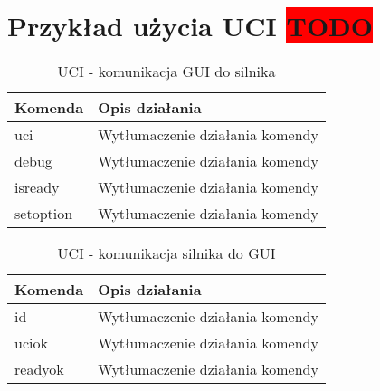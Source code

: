 \chapter{Przykład użycia UCI \colorbox{red}{TODO}}
\label{ch:przyklad-uci}

\begin{table}[htb] \small
\centering
\caption{UCI - komunikacja GUI do silnika}
\label{tab:UCI_GUI_silnik}
\begin{tabularx}{\linewidth}{|p{.25\linewidth}|X|}\hline
Komenda & Opis działania \\ \hline\hline

uci & Wytłumaczenie działania komendy \\ \hline
debug & Wytłumaczenie działania komendy \\ \hline
isready & Wytłumaczenie działania komendy \\ \hline
setoption & Wytłumaczenie działania komendy \\ \hline
\end{tabularx}
\end{table}

\begin{table}[htb] \small
\centering
\caption{UCI - komunikacja silnika do GUI}
\label{tab:UCI_silnik_GUI}
\begin{tabularx}{\linewidth}{|p{.25\linewidth}|X|}\hline
Komenda & Opis działania \\ \hline\hline

id & Wytłumaczenie działania komendy \\ \hline
uciok & Wytłumaczenie działania komendy \\ \hline
readyok & Wytłumaczenie działania komendy \\ \hline
\end{tabularx}
\end{table}